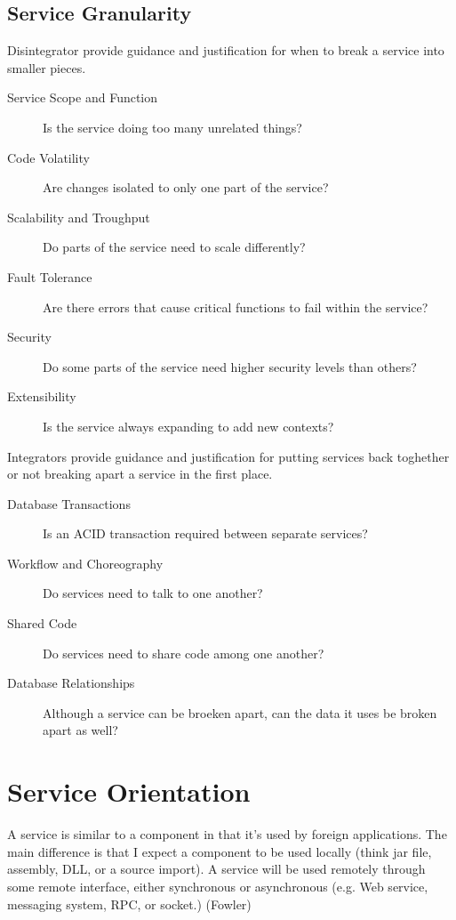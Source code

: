 \documentclass[../Main.tex]{subfiles}
\begin{document}
\subsection{Service Granularity}
\begin{multicols}{2}
    Disintegrator provide guidance and justification for when to break a service into smaller pieces.
    \begin{description}
        \item[Service Scope and Function] Is the service doing too many unrelated things?
        \item[Code Volatility] Are changes isolated to only one part of the service?
        \item[Scalability and Troughput] Do parts of the service need to scale differently?
        \item[Fault Tolerance] Are there errors that cause critical functions to fail within the service?
        \item[Security] Do some parts of the service need higher security levels than others?
        \item[Extensibility] Is the service always expanding to add new contexts?   
    \end{description}
    \columnbreak
    Integrators provide guidance and justification for putting services back  toghether or not breaking apart a service in the first place.
    \begin{description}
        \item[Database Transactions] Is an ACID transaction required between separate services?
        \item[Workflow and Choreography] Do services need to talk to one another?
        \item[Shared Code] Do services need to share code among one another?
        \item[Database Relationships] Although a service can be broeken apart, can the data it uses be broken apart as well?    
    \end{description}
\end{multicols}
\newpage

\section{Service Orientation}
A service is similar to a component in that it's used by foreign applications. The main 
difference is that I expect a component to be used locally (think jar file, assembly, DLL, or a 
source import). A service will be used remotely through some remote interface, either 
synchronous or asynchronous (e.g. Web service, messaging system, RPC, or socket.) (Fowler)
\end{document}
